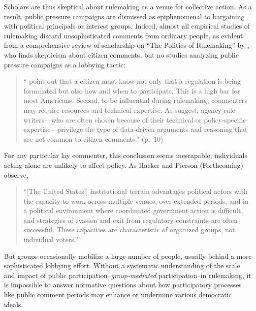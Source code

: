 \documentclass[
      12pt,
        ]{article}
\begin{document}
Scholars are thus skeptical about rulemaking as a venue for collective action. As a result, public pressure campaigns are dismissed as epiphenomenal to bargaining with political principals
or interest groups. Indeed, almost all empirical studies of rulemaking
discard unsophisticated comments from ordinary people, as evident from a
comprehensive review of scholarship on ``The Politics of Rulemaking'' by
\citet{Yackee2019}, who finds skepticism about citizen comments, but no studies
analyzing public pressure campaigns as a lobbying tactic:

\begin{quote}
``\citet{Kerwin2011} point out that a citizen must know not only that a regulation is being formulated but also how and when to participate. This is a high bar for most Americans. Second, to be influential during rulemaking, commenters may require resources and technical expertise. As \citet{Epstein2014} suggest, agency rule-writers---who are often chosen because of their technical or policy-specific expertise---privilege the type of data-driven arguments and reasoning
that are not common to citizen comments.'' (p.~10)
\end{quote}

For any particular lay commenter, this conclusion seems inescapable; individuals acting alone are unlikely to affect policy. As Hacker and Pierson (Forthcoming) observe,

\begin{quote}
``{[}The United States'{]} institutional terrain advantages political actors with the capacity to work across multiple venues, over extended periods, and in a political environment where coordinated government action is difficult, and strategies of evasion and exit from regulatory constraints are often successful. These capacities are characteristic of organized groups, not individual voters.''
\end{quote}

But groups occasionally mobilize a large number of people, usually behind a more sophisticated lobbying effort. Without a systematic understanding of the scale and impact of public participation--\emph{group-mediated} participation--in rulemaking, it is impossible to answer normative questions about how participatory processes like public comment periods may enhance or undermine various democratic ideals.
\end{document}
